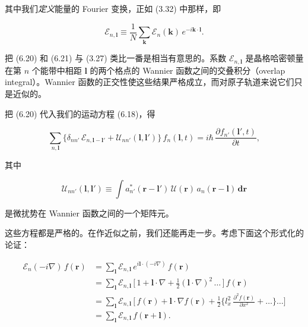 其中我们\emph{定义}能量的 Fourier 变换，正如 (3.32) 中那样，即

\begin{equation*}
\mathcal{E}_{n,\boldsymbol{l}} \equiv \frac{1}{N}\sum_{\mathbf{k}} \mathcal{E}_n(\mathbf{k})\,e^{-i\mathbf{k}\cdot\boldsymbol{l}}.
\tag{6.21}
\end{equation*}

把 (6.20) 和 (6.21) 与 (3.27) 类比一番是相当有意思的。系数 $\mathcal{E}_{n,\boldsymbol{l}}$ 是晶格哈密顿量在第 $n$ 个能带中相距 $\boldsymbol{l}$ 的两个格点的 Wannier 函数之间的交叠积分（overlap integral）。Wannier 函数的正交性使这些结果严格成立，而对原子轨道来说它们只是近似的。

把 (6.20) 代入我们的运动方程 (6.18)，得

\begin{equation*}
\sum_{n,\boldsymbol{l}} \big\{\delta_{nn'}\,\mathcal{E}_{n,\boldsymbol{l}-\boldsymbol{l}'} + \mathcal{U}_{nn'}(\boldsymbol{l},\boldsymbol{l}')\big\}\,f_n(\boldsymbol{l},t) = i\hbar\,\frac{\partial f_{n'}(\boldsymbol{l}',t)}{\partial t},
\tag{6.22}
\end{equation*}

其中

\begin{equation*}
\mathcal{U}_{nn'}(\boldsymbol{l},\boldsymbol{l}') \equiv \int a_{n'}^{*}(\mathbf{r}-\boldsymbol{l}')\,\mathcal{U}(\mathbf{r})\,a_n(\mathbf{r}-\boldsymbol{l})\,\mathbf{dr}
\tag{6.23}
\end{equation*}

是微扰势在 Wannier 函数之间的一个矩阵元。

这些方程都是严格的。在作近似之前，我们还能再走一步。考虑下面这个形式化的论证：

\begin{align*}
\mathcal{E}_n(-i\nabla)\,f(\mathbf{r}) &= \sum_{\boldsymbol{l}} \mathcal{E}_{n,\boldsymbol{l}}\,e^{i\boldsymbol{l}\cdot(-i\nabla)}\,f(\mathbf{r}) \\
&= \sum_{\boldsymbol{l}} \mathcal{E}_{n,\boldsymbol{l}}\,\big[\,1 + \boldsymbol{l}\cdot\nabla + \tfrac{1}{2}(\boldsymbol{l}\cdot\nabla)^2\,\ldots\,\big]\,f(\mathbf{r}) \\
&= \sum_{\boldsymbol{l}} \mathcal{E}_{n,\boldsymbol{l}}\,\Big[\,f(\mathbf{r}) + \boldsymbol{l}\cdot\nabla f(\mathbf{r}) + \frac{1}{2}\Big\{l_x^2\,\frac{\partial^2 f(\mathbf{r})}{\partial x^2} + \ldots\Big\}\ldots\Big] \\
&= \sum_{\boldsymbol{l}} \mathcal{E}_{n,\boldsymbol{l}}\,f(\mathbf{r}+\boldsymbol{l}). \tag{6.24}
\end{align*}

